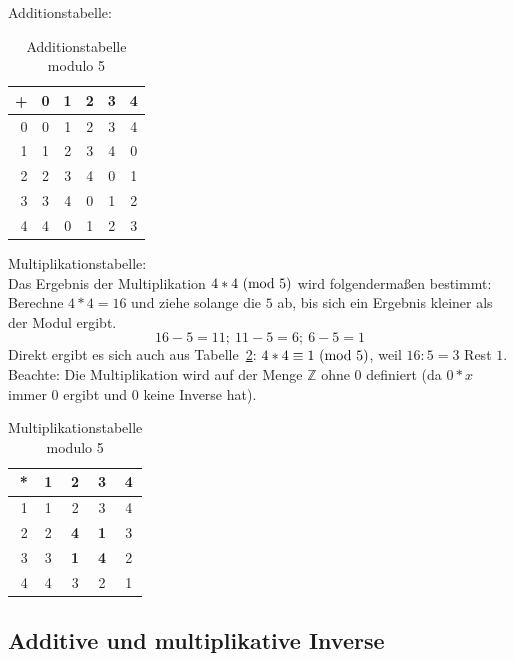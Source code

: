 \begin{refsegment}
\begin{example}{ Additionstabelle:}
\begin{table}[!ht]
\begin{center}
\begin{tabular}{r|ccccc}
+ &  0 & 1 & 2 & 3 & 4\\
\hline
0 &  0 & 1 & 2 & 3 & 4\\
1 & 1 &  2 & 3 & 4 & 0\\
2 & 2 & 3 & 4 & 0 & 1\\
3 & 3 & 4 & 0 & 1 & 2\\
4 & 4 & 0 & 1 & 2 & 3
\end{tabular}
\end{center}
\caption{Additionstabelle modulo 5}
\label{addmod5}
\end{table}
\end{example}

\begin{example}{ Multiplikationstabelle:}\\
Das Ergebnis der Multiplikation $4 * 4 {\rm ~(mod~ } 5)$ wird folgendermaßen
bestimmt: Berechne $ 4*4=16$ und ziehe solange die $5$ ab, bis sich ein
Ergebnis kleiner als der Modul ergibt.
$$16 - 5 = 11;~ 11 - 5 = 6;~6- 5 = 1$$
Direkt ergibt es sich auch aus Tabelle~\ref{mulmod5}: $4 * 4 \equiv
1 {\rm ~(mod~} 5)$, weil $16 : 5 = 3$ Rest $1$.\\
Beachte: Die Multiplikation wird auf der Menge $\mathbb{Z}$ ohne $0$ definiert
(da $0*x$ immer $0$ ergibt und $0$ keine Inverse hat).

\begin{table}[ht]
\begin{center}
\begin{tabular}{r|cccc}
* & 1& 2 & 3 & 4\\
\hline
1 & 1 &    2    &    3    & 4\\
2 & 2 & \textbf{4} & \textbf{1} & 3\\
3 & 3 & \textbf{1} & \textbf{4} & 2\\
4 & 4 &    3    &    2    & 1
\end{tabular}
\end{center}
\caption{Multiplikationstabelle modulo 5}
\label{mulmod5}
\end{table}
\end{example}


\subsection{Additive und multiplikative Inverse}
\label{add-and-mult-inverses}\label{multmodn}
 


\end{refsegment}
